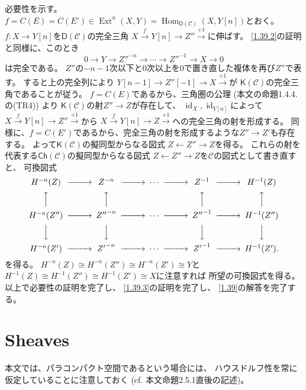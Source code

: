 \documentclass[uplatex,dvipdfmx]{jsarticle}
\makeatletter
\theoremstyle{definition}
\renewenvironment{proof}[1][\proofname]{
  \pushQED{\qed}%
  \normalfont \topsep6\p@\@plus6\p@\relax
  \trivlist
  \item[\hskip\labelsep
    #1\@addpunct{\textbf{.}}]\ignorespaces
}{%
  \popQED\endtrivlist\@endpefalse
}
\providecommand{\proofname}{証明}
\DeclareMathOperator{\Hom}{\mathrm{Hom}}
\DeclareMathOperator{\id}{\mathrm{id}}
\DeclareMathOperator{\Ext}{\mathrm{Ext}}
\newcommand{\Ch}{\mathsf{Ch}}
\newcommand{\sfK}{\mathsf{K}}
\newcommand{\sfD}{\mathsf{D}}
\newcommand\mcC{\mathcal{C}}
\makeatother
\begin{document}
\begin{proof}
  必要性を示す。
  \(f = C(E) = C(E')\in \Ext^n(X,Y) = \Hom_{\sfD(\mcC)}(X,Y[n])\)とおく。
  \(f:X\to Y[n]\)を\(\sfD(\mcC)\)の完全三角
  \(X\xrightarrow{f} Y[n]\to Z'' \xrightarrow{+1}\)に伸ばす。
  \ref{1.39.2}の証明と同様に、このとき
  \[
  0\to Y\to {Z''}^{-n} \to \cdots \to {Z''}^{-1} \to X\to 0
  \]
  は完全である。
  \(Z''\)の\(-n-1\)次以下と\(0\)次以上を\(0\)で置き直した複体を再び\(Z''\)で表す。
  すると上の完全列により
  \(Y[n-1]\to Z'' [-1] \to X\xrightarrow{+1}\)が
  \(\sfK(\mcC)\)の完全三角であることが従う。
  \(f=C(E)\)であるから、三角圏の公理 (本文の命題1.4.4.の(TR4)) より
  \(\sfK(\mcC)\)の射\(Z''\to Z\)が存在して、
  \(\id_X,\id_{Y[n]}\)によって
  \(X\xrightarrow{f} Y[n]\to Z'' \xrightarrow{+1}\)から
  \(X\xrightarrow{f} Y[n]\to Z \xrightarrow{+1}\)への完全三角の射を形成する。
  同様に、\(f=C(E')\)であるから、完全三角の射を形成するような\(Z''\to Z'\)も存在する。
  よって\(\sfK(\mcC)\)の擬同型からなる図式
  \(Z \gets Z'' \to Z\)を得る。
  これらの射を代表する\(\Ch(\mcC)\)の擬同型からなる図式
  \(Z\gets Z'' \to Z\)を\(\mcC\)の図式として書き直すと、
  可換図式
  \[
  \begin{CD}
    H^{-n}(Z) @>>> Z^{-n} @>>> \cdots @>>> Z^{-1} @>>> H^{-1}(Z) \\
    @AAA @AAA @. @AAA @AAA \\
    H^{-n}(Z'') @>>> {Z''}^{-n} @>>> \cdots @>>> {Z''}^{-1} @>>> H^{-1}(Z'') \\
    @VVV @VVV @. @VVV @VVV \\
    H^{-n}(Z') @>>> {Z'}^{-n} @>>> \cdots @>>> {Z'}^{-1} @>>> H^{-1}(Z').
  \end{CD}
  \]
  を得る。
  \(H^{-n}(Z) \cong H^{-n}(Z'') \cong H^{-n}(Z') \cong Y\)と
  \(H^{-1}(Z) \cong H^{-1}(Z'') \cong H^{-1}(Z') \cong X\)に注意すれば
  所望の可換図式を得る。以上で必要性の証明を完了し、
  \ref{1.39.3}の証明を完了し、
  \autoref{1.39}の解答を完了する。
\end{proof}














\newpage
\section{Sheaves}

本文では、パラコンパクト空間であるという場合には、
ハウスドルフ性を常に仮定していることに注意しておく
(cf. 本文命題2.5.1直後の記述)。
\end{document}
